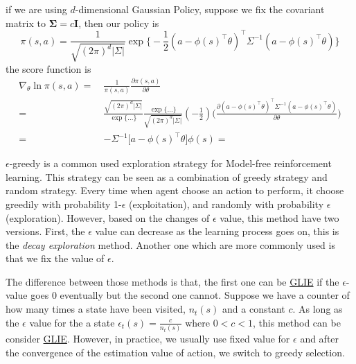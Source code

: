 \documentclass[9pt]{article}
\begin{document}
if we are using $d$-dimensional Gaussian Policy, suppose we fix the covariant matrix to $\mathbf{\Sigma} = c\mathbf{I}$, then our policy is 
\[
\pi(s,a) = \frac{1}{\sqrt{(2 \pi)^{d} |\Sigma|}} \exp\big\{ -\frac{1}{2} (a-\phi(s)^\top\theta)^\top\Sigma^{-1}(a-\phi(s)^\top\theta)\big\}
\]
the score function is 
\[
\begin{split}
\nabla_{\theta} \ln \pi(s,a) =\ & \frac{1}{\pi(s,a)} \frac{\partial \pi(s,a)}{\partial \theta}\\
=\ & \frac{\sqrt{(2 \pi)^d |\Sigma|}}{\exp\big \{ \ldots \big \}}  \frac{\exp\big \{ \ldots \big \}}{\sqrt{(2 \pi)^d |\Sigma|}} (-\frac{1}{2}) \big( \frac{\partial (a-\phi(s)^\top\theta)^\top\Sigma^{-1}(a-\phi(s)^\top\theta)}{\partial \theta}\big)\\
=\ & -\Sigma^{-1} \big[a-\phi(s)^\top \theta \big] \phi(s) 
=
\end{split}
\]



$\epsilon$-greedy is a common used exploration strategy for Model-free reinforcement learning. This strategy can be seen as a combination of greedy strategy and random strategy. Every time when agent choose an action to perform, it choose greedily with probability 1-$\epsilon$ (exploitation), and randomly with probability $\epsilon$ (exploration). However, based on the changes of $\epsilon$ value, this method have two versions. First, the $\epsilon$ value can decrease as the learning process goes on, this is the \textit{decay exploration} method. Another one which are more commonly used is that we fix the value of $\epsilon$. 

The difference between those methods is that, the first one can be \hyperlink{glie}{GLIE} if the $\epsilon$-value goes 0 eventually but the second one cannot. Suppose we have a counter of how many times a state have been visited, $n_t(s)$ and a constant $c$. As long as the $\epsilon$ value for the a state $\epsilon_t(s) = \frac{c}{n_t(s)}$ where $0<c<1$, this method can be consider \hyperlink{glie}{GLIE}. However, in practice, we usually use fixed value for $\epsilon$ and after the convergence of the estimation value of action, we switch to greedy selection. 
\end{document}
